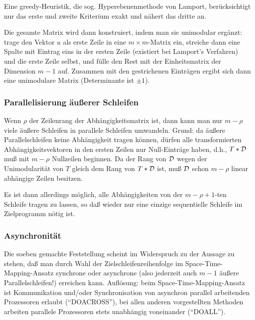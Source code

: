 Eine greedy-Heuristik, die sog. Hyperebenenmethode von Lamport,
berücksichtigt nur das erste und zweite Kriterium exakt und nähert das
dritte an.

\smallskip 

Die gesamte Matrix wird dann konstruiert, indem man sie unimodular
ergänzt: trage den Vektor $u$ als erste Zeile in eine
$m\!\times\!m$-Matrix ein, streiche dann eine Spalte mit Eintrag eins in
der ersten Zeile (existiert bei Lamport's Verfahren) und die erste Zeile
selbst, und fülle den Rest mit der Einheitsmatrix der Dimension
$m\!-\!1$ auf. Zusammen mit den gestrichenen Einträgen ergibt sich dann
eine unimodulare Matrix (Determinante ist $\pm 1$).


\subsubsection{Parallelisierung äußerer Schleifen}
\label{sec:pas}

Wenn $\rho$ der Zeilenrang der Abhängigkeitsmatrix ist, dann kann man
nur $m\!-\!\rho$ viele äußere Schleifen in parallele Schleifen umwandeln.
Grund: da äußere Parallelschleifen keine Abhängigkeit tragen können,
dürfen alle transformierten Abhängigkeitsvektoren in den ersten Zeilen
nur Null-Einträge haben, d.h., $T*\cal D$ muß mit $m\!-\!\rho$
Nullzeilen beginnen. Da der Rang von $\cal D$ wegen der Unimodularität
von $T$ gleich dem Rang von $T*\cal D$ ist, muß $\cal D$ schon $m\!-\!\rho$
linear abhängige Zeilen besitzen.

Es ist dann allerdings möglich, alle Abhängigkeiten von der
$m\!-\!\rho\!+\!1$-ten Schleife tragen zu lassen, so daß wieder nur eine
einzige sequentielle Schleife im Zielprogramm nötig ist.

\subsubsection{Asynchronität}

Die soeben gemachte Feststellung scheint im Widerspruch zu der Aussage
zu stehen, daß man durch Wahl der Zielschleifenreihenfolge im
Space-Time-Mapping-Ansatz synchrone oder asynchrone (also jederzeit auch
$m\!-\!1$ äußere Parallelschleifen!) erreichen kann. Auflösung: beim
Space-Time-Mapping-Ansatz ist Kommunikation und/oder Synchronisation von
asynchron parallel arbeitenden Prozessoren erlaubt (``DOACROSS''), bei allen
anderen vorgestellten Methoden arbeiten parallele Prozessoren stets
unabhängig voneinander (``DOALL''). 


